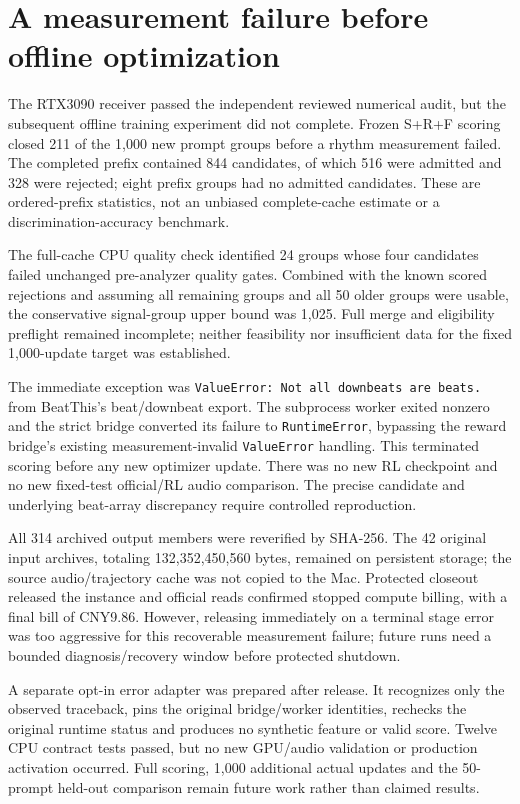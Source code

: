 \section{A measurement failure before offline optimization}
\label{sec:offline-scoring-abort}
The RTX3090 receiver passed the independent reviewed numerical audit, but the
subsequent offline training experiment did not complete. Frozen S+R+F scoring
closed 211 of the 1,000 new prompt groups before a rhythm measurement failed.
The completed prefix contained 844 candidates, of which 516 were admitted and
328 were rejected; eight prefix groups had no admitted candidates. These are
ordered-prefix statistics, not an unbiased complete-cache estimate or a
discrimination-accuracy benchmark.

The full-cache CPU quality check identified 24 groups whose four candidates
failed unchanged pre-analyzer quality gates. Combined with the known scored
rejections and assuming all remaining groups and all 50 older groups were
usable, the conservative signal-group upper bound was 1,025. Full merge and
eligibility preflight remained incomplete; neither feasibility nor insufficient
data for the fixed 1,000-update target was established.

The immediate exception was \texttt{ValueError: Not all downbeats are beats.}
from BeatThis's beat/downbeat export. The subprocess worker exited nonzero and
the strict bridge converted its failure to \texttt{RuntimeError}, bypassing the
reward bridge's existing measurement-invalid \texttt{ValueError} handling.
This terminated scoring before any new optimizer update. There was no new RL
checkpoint and no new fixed-test official/RL audio comparison. The precise
candidate and underlying beat-array discrepancy require controlled reproduction.

All 314 archived output members were reverified by SHA-256. The 42 original
input archives, totaling 132,352,450,560 bytes, remained on persistent storage;
the source audio/trajectory cache was not copied to the Mac. Protected closeout
released the instance and official reads confirmed stopped compute billing,
with a final bill of CNY9.86. However, releasing immediately on a terminal stage
error was too aggressive for this recoverable measurement failure; future runs
need a bounded diagnosis/recovery window before protected shutdown.

A separate opt-in error adapter was prepared after release. It recognizes only
the observed traceback, pins the original bridge/worker identities, rechecks
the original runtime status and produces no synthetic feature or valid score.
Twelve CPU contract tests passed, but no new GPU/audio validation or production
activation occurred. Full scoring, 1,000 additional actual updates and the
50-prompt held-out comparison remain future work rather than claimed results.

